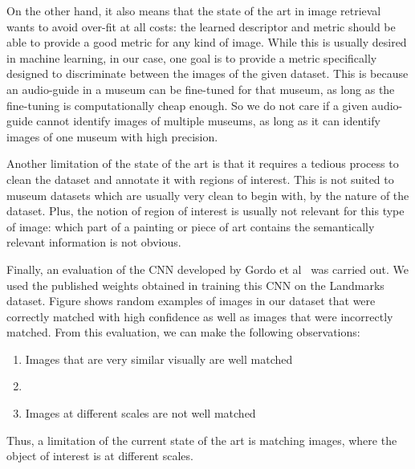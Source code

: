 On the other hand, it also means that the state of the art in
image retrieval wants to avoid over-fit at all costs:
the learned descriptor and metric should
be able to provide a good metric for any kind of image.
While this is usually desired in machine learning, in our case,
one goal is to provide a metric specifically designed
to discriminate between the images of the given dataset. This is because
an audio-guide in a museum can be fine-tuned for that museum, as long
as the fine-tuning is computationally cheap enough. So we do not care
if a given audio-guide cannot identify images of multiple museums,
as long as it can identify images of one museum with high precision.

Another limitation of the state of the art is that it requires
a tedious process to clean the dataset and annotate it with regions of
interest. This is not suited to museum datasets which are usually very
clean to begin with, by the nature of the dataset. Plus, the notion of
region of interest is usually not relevant for this type of image:
which part of a painting or piece of art contains the semantically
relevant information is not obvious.

Finally, an evaluation of the CNN developed by
Gordo et al~\cite{gordo_deep_2016} was carried out.
We used the published weights obtained in training this CNN on the
Landmarks dataset.
Figure %
shows random examples of images in our dataset that were correctly matched
with high confidence as well as images that were incorrectly matched.
From this evaluation, we can make the following observations:

\begin{enumerate}
    \item Images that are very similar visually are well matched
    \item %
    \item Images at different scales are not well matched
\end{enumerate}

Thus, a limitation of the current state of the art is matching
images, where the object of interest is at different scales.
